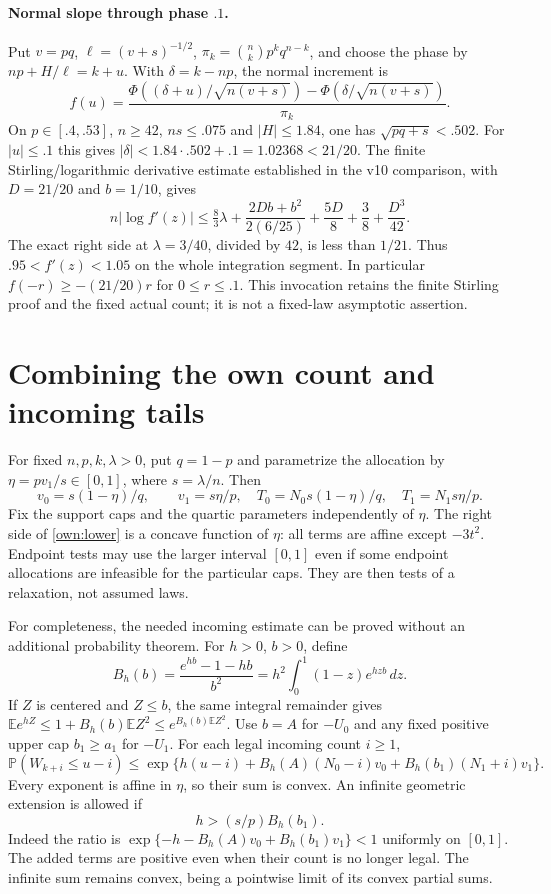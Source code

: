 \documentclass[11pt]{article}
\newcommand{\E}{\mathbb E}
\newcommand{\Pp}{\mathbb P}
\begin{document}
\paragraph{Normal slope through phase $.1$.}
Put $v=pq$, $\ell=(v+s)^{-1/2}$, $\pi_k=\binom nkp^kq^{n-k}$,
and choose the phase by $np+H/\ell=k+u$. With $\delta=k-np$, the
normal increment is
\[
 f(u)=\frac{\Phi((\delta+u)/\sqrt{n(v+s)})-
                 \Phi(\delta/\sqrt{n(v+s)})}{\pi_k}.
\]
On $p\in[.4,.53]$, $n\ge42$, $ns\le.075$ and $|H|\le1.84$,
one has $\sqrt{pq+s}<.502$. For $|u|\le.1$ this gives
$|\delta|<1.84\cdot.502+.1=1.02368<21/20$.
The finite Stirling/logarithmic derivative estimate established in the
v10 comparison, with $D=21/20$ and $b=1/10$, gives
\[
 n|\log f'(z)|\le\tfrac83\lambda+
 \frac{2Db+b^2}{2(6/25)}+\frac{5D}{8}+\frac38+\frac{D^3}{42}.
\]
The exact right side at $\lambda=3/40$, divided by $42$, is less
than $1/21$. Thus $.95<f'(z)<1.05$ on the whole integration
segment. In particular $f(-r)\ge-(21/20)r$ for $0\le r\le.1$.
This invocation retains the finite Stirling proof and the fixed actual
count; it is not a fixed-law asymptotic assertion.

\section*{Combining the own count and incoming tails}
For fixed $n,p,k,\lambda>0$, put $q=1-p$ and parametrize the allocation
by $\eta=pv_1/s\in[0,1]$, where $s=\lambda/n$. Then
\[
 v_0=s(1-\eta)/q,\qquad v_1=s\eta/p,
 \quad T_0=N_0s(1-\eta)/q,\quad T_1=N_1s\eta/p.
\]
Fix the support caps and the quartic parameters independently of $\eta$.
The right side of \eqref{own:lower} is a concave function of $\eta$:
all terms are affine except $-3t^2$. Endpoint tests may use the larger
interval $[0,1]$ even if some endpoint allocations are infeasible for the
particular caps. They are then tests of a relaxation, not assumed laws.

For completeness, the needed incoming estimate can be proved without
an additional probability theorem. For $h>0$, $b>0$, define
\[
 B_h(b)=\frac{e^{hb}-1-hb}{b^2}
        =h^2\int_0^1(1-z)e^{hzb}\,dz.
\]
If $Z$ is centered and $Z\le b$, the same integral remainder gives
$\E e^{hZ}\le1+B_h(b)\E Z^2\le e^{B_h(b)\E Z^2}$.
Use $b=A$ for $-U_0$ and any fixed positive upper cap $b_1\ge a_1$
for $-U_1$. For each legal incoming count $i\ge1$,
\begin{equation}\label{own:chernoff}
 \Pp(W_{k+i}\le u-i)\le
 \exp\{h(u-i)+B_h(A)(N_0-i)v_0+B_h(b_1)(N_1+i)v_1\}.
\end{equation}
Every exponent is affine in $\eta$, so their sum is convex.
An infinite geometric extension is allowed if
\[
                  h> (s/p)B_h(b_1).
\]
Indeed the ratio is
$\exp\{-h-B_h(A)v_0+B_h(b_1)v_1\}<1$ uniformly on $[0,1]$.
The added terms are positive even when their count is no longer legal.
The infinite sum remains convex, being a pointwise limit of its convex
partial sums.
\end{document}

